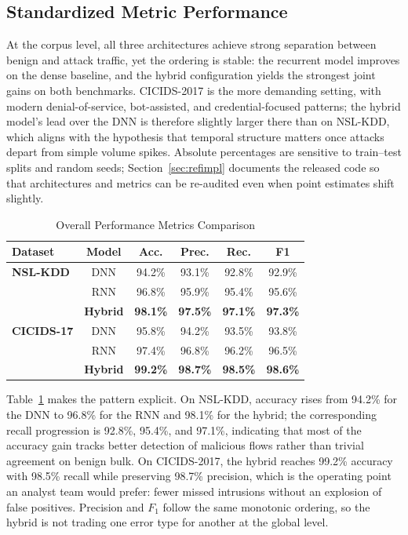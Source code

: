 \documentclass[10pt, conference, compsocconf, letterpaper, twocolumn, twoside]{IEEEtran}
\begin{document}
\subsection{Standardized Metric Performance}
At the corpus level, all three architectures achieve strong separation between benign and attack traffic, yet the ordering is stable: the recurrent model improves on the dense baseline, and the hybrid configuration yields the strongest joint gains on both benchmarks. CICIDS-2017 is the more demanding setting, with modern denial-of-service, bot-assisted, and credential-focused patterns; the hybrid model's lead over the DNN is therefore slightly larger there than on NSL-KDD, which aligns with the hypothesis that temporal structure matters once attacks depart from simple volume spikes. Absolute percentages are sensitive to train--test splits and random seeds; Section~\ref{sec:refimpl} documents the released code so that architectures and metrics can be re-audited even when point estimates shift slightly.

\begin{table}[h]
\centering
\caption{Overall Performance Metrics Comparison}
\label{table:overall_metrics}
\begin{tabular}{|l|c|c|c|c|c|}
\hline
\textbf{Dataset} & \textbf{Model} & \textbf{Acc.} & \textbf{Prec.} & \textbf{Rec.} & \textbf{F1} \\ \hline
\textbf{NSL-KDD} & DNN & 94.2\% & 93.1\% & 92.8\% & 92.9\% \\ 
 & RNN & 96.8\% & 95.9\% & 95.4\% & 95.6\% \\ 
 & \textbf{Hybrid} & \textbf{98.1\%} & \textbf{97.5\%} & \textbf{97.1\%} & \textbf{97.3\%} \\ \hline
\textbf{CICIDS-17} & DNN & 95.8\% & 94.2\% & 93.5\% & 93.8\% \\ 
 & RNN & 97.4\% & 96.8\% & 96.2\% & 96.5\% \\ 
 & \textbf{Hybrid} & \textbf{99.2\%} & \textbf{98.7\%} & \textbf{98.5\%} & \textbf{98.6\%} \\ \hline
\end{tabular}
\end{table}

Table~\ref{table:overall_metrics} makes the pattern explicit. On NSL-KDD, accuracy rises from 94.2\% for the DNN to 96.8\% for the RNN and 98.1\% for the hybrid; the corresponding recall progression is 92.8\%, 95.4\%, and 97.1\%, indicating that most of the accuracy gain tracks better detection of malicious flows rather than trivial agreement on benign bulk. On CICIDS-2017, the hybrid reaches 99.2\% accuracy with 98.5\% recall while preserving 98.7\% precision, which is the operating point an analyst team would prefer: fewer missed intrusions without an explosion of false positives. Precision and $F_1$ follow the same monotonic ordering, so the hybrid is not trading one error type for another at the global level.
\end{document}
